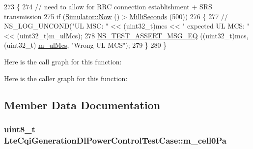 \begin{DoxyCode}
273 \{
274   \textcolor{comment}{// need to allow for RRC connection establishment + SRS transmission}
275   \textcolor{keywordflow}{if} (\hyperlink{group__simulator_gac3635e2e87f7ce316c89290ee1b01d0d}{Simulator::Now} () > \hyperlink{group__timecivil_gaf26127cf4571146b83a92ee18679c7a9}{MilliSeconds} (500))
276     \{
277 \textcolor{comment}{//        NS\_LOG\_UNCOND("UL MSC: " << (uint32\_t)mcs << " expected UL MCS: " << (uint32\_t)m\_ulMcs);}
278       \hyperlink{group__testing_ga2a9d78cffb3db8e867c35fff0b698cf5}{NS\_TEST\_ASSERT\_MSG\_EQ} ((uint32\_t)mcs, (uint32\_t)
      \hyperlink{classLteCqiGenerationDlPowerControlTestCase_a8d8692ed37c7a9d98605af24a4d0c17d}{m\_ulMcs}, \textcolor{stringliteral}{"Wrong UL MCS"});
279     \}
280 \}
\end{DoxyCode}


Here is the call graph for this function\+:




Here is the caller graph for this function\+:




\subsection{Member Data Documentation}
\subsubsection[{\texorpdfstring{m\+\_\+cell0\+Pa}{m_cell0Pa}}]{\setlength{\rightskip}{0pt plus 5cm}uint8\+\_\+t Lte\+Cqi\+Generation\+Dl\+Power\+Control\+Test\+Case\+::m\+\_\+cell0\+Pa\hspace{0.3cm}{\ttfamily [private]}}\hypertarget{classLteCqiGenerationDlPowerControlTestCase_a3e589a276efa33f73261038924d1b919}{}\label{classLteCqiGenerationDlPowerControlTestCase_a3e589a276efa33f73261038924d1b919}
